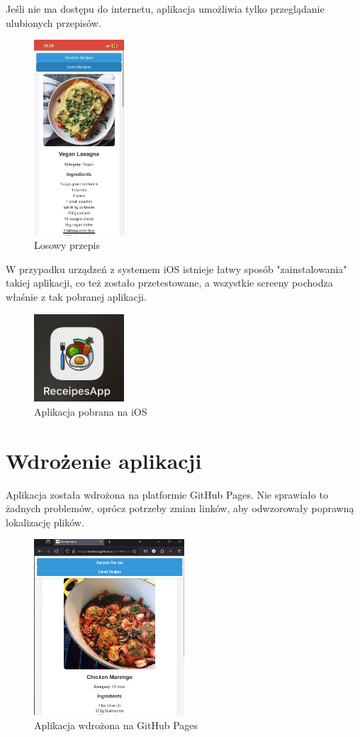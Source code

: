 \documentclass[a4paper,12pt]{article}
\begin{document}
Jeśli nie ma dostępu do internetu, aplikacja umożliwia tylko przeglądanie ulubionych przepisów.

\begin{figure}[H]
    \centering
    \includegraphics[width=0.3\textwidth]{images/zapisany.jpg}
    \caption{Losowy przepis}
    \label{fig:saved}
\end{figure}

W przypadku urządzeń z systemem iOS istnieje łatwy sposób "zainstalowania" takiej aplikacji, co też zostało przetestowane, a wszystkie screeny pochodza właśnie z tak pobranej aplikacji.

\begin{figure}[H]
    \centering
    \includegraphics[width=0.3\textwidth]{images/ikona.jpg}
    \caption{Aplikacja pobrana na iOS}
    \label{fig:ios}
\end{figure}

\section{Wdrożenie aplikacji}
Aplikacja została wdrożona na platformie GitHub Pages. Nie sprawiało to żadnych problemów, oprócz potrzeby zmian linków, aby odwzorowały poprawną lokalizację plików.

\begin{figure}[H]
    \centering
    \includegraphics[width=0.5\textwidth]{images/gp.png}
    \caption{Aplikacja wdrożona na GitHub Pages}
    \label{fig:gp}
\end{figure}
\end{document}
